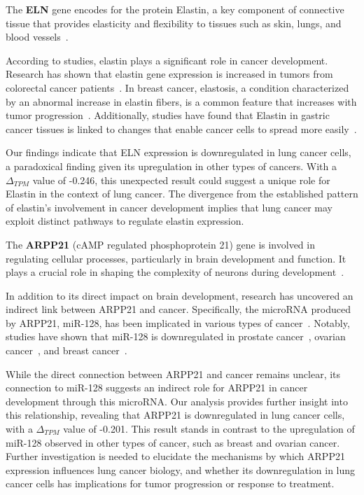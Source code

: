 The \textbf{ELN} gene encodes for the protein Elastin,
a key component of connective tissue that provides elasticity and
flexibility to tissues such as skin, lungs, and blood vessels~\cite{Debelle1999ELN}.

According to studies, elastin plays a significant role in cancer development.
Research has shown that elastin gene expression is increased in tumors from colorectal cancer patients~\cite{Li2020ELN}.
In breast cancer, elastosis, a condition characterized by an abnormal increase in elastin fibers,
is a common feature that increases with tumor progression~\cite{Lepucki2022ELN}.
Additionally, studies have found that Elastin in gastric cancer tissues is linked to changes that enable cancer cells
to spread more easily~\cite{Fang2023ELN}.

Our findings indicate that ELN expression is downregulated in lung cancer cells,
a paradoxical finding given its upregulation in other types of cancers.
With a $\Delta_{TPM}$ value of -0.246, this unexpected result could suggest a unique role for Elastin in the context of lung cancer.
The divergence from the established pattern of elastin's involvement in cancer development implies
that lung cancer may exploit distinct pathways to regulate elastin expression.
\newline

The \textbf{ARPP21} (cAMP regulated phosphoprotein 21) gene is involved in regulating cellular processes,
particularly in brain development and function.
It plays a crucial role in shaping the complexity of neurons during development~\cite{Rehfeld2018ARPP21}.

In addition to its direct impact on brain development, research has uncovered an indirect link between ARPP21 and cancer.
Specifically, the microRNA produced by ARPP21, miR-128, has been implicated in various types of cancer~\cite{Li2013ARPP21}.
Notably, studies have shown that miR-128 is downregulated in prostate cancer~\cite{Khan2010ARPP21}, ovarian cancer~\cite{Woo2012ARPP21},
and breast cancer~\cite{Zhu2011ARPP21}.

While the direct connection between ARPP21 and cancer remains unclear,
its connection to miR-128 suggests an indirect role for ARPP21 in cancer development through this microRNA.
Our analysis provides further insight into this relationship, revealing that ARPP21 is downregulated in lung cancer cells,
with a $\Delta_{TPM}$ value of -0.201.
This result stands in contrast to the upregulation of miR-128 observed in other types of cancer, such as breast and ovarian cancer.
Further investigation is needed to elucidate the mechanisms by which ARPP21 expression influences lung cancer biology,
and whether its downregulation in lung cancer cells has implications for tumor progression or response to treatment.
\newline


